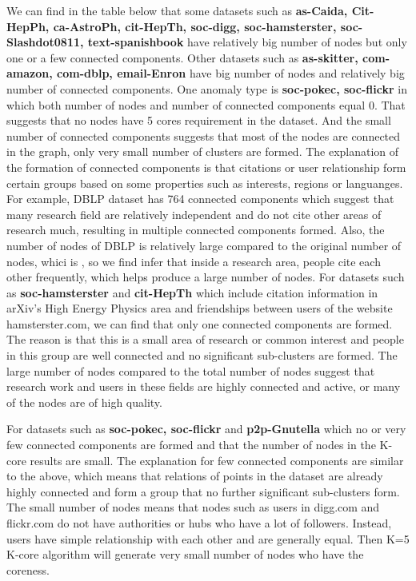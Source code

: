 We can find in the table below that some datasets such as \textbf{as-Caida, Cit-HepPh, ca-AstroPh, cit-HepTh, soc-digg, soc-hamsterster, soc-Slashdot0811, text-spanishbook} have relatively big number of nodes but only one or a few connected components. Other datasets such as \textbf{as-skitter, com-amazon, com-dblp, email-Enron} have big number of nodes and relatively big number of connected components. One anomaly type is \textbf{soc-pokec, soc-flickr} in which both number of nodes and number of connected components equal 0. That suggests that no nodes have 5 cores requirement in the dataset. And the small number of connected components suggests that most of the nodes are connected in the graph, only very small number of clusters are formed. The explanation of the formation of connected components is that citations or user relationship form certain groups based on some properties such as interests, regions or languanges.
For example, DBLP dataset has 764 connected components which suggest that many research field are relatively independent and do not cite other areas of research much, resulting in multiple connected components formed. Also, the number of nodes of DBLP is relatively large compared to the original number of nodes, whici is , so we find infer that inside a research area, people cite each other frequently, which helps produce a large number of nodes.
For datasets such as \textbf{soc-hamsterster} and \textbf{cit-HepTh} which include citation information in arXiv's High Energy Physics area and friendships between users of the website hamsterster.com, we can find that only one connected components are formed. The reason is that this is a small area of research or common interest and people in this group are well connected and no significant sub-clusters are formed. The large number of nodes compared to the total number of nodes suggest that research work and users in these fields are highly connected and active, or many of the nodes are of high quality.

For datasets such as \textbf{soc-pokec, soc-flickr} and \textbf{p2p-Gnutella} which no or very few connected components are formed and that the number of nodes in the K-core results are small. The explanation for few connected components are similar to the above, which means that relations of points in the dataset are already highly connected and form a group that no further significant sub-clusters form. The small number of nodes means that nodes such as users in digg.com and flickr.com do not have authorities or hubs who have a lot of followers. Instead, users have simple relationship with each other and are generally equal. Then K=5 K-core algorithm will generate very small number of nodes who have the coreness.

